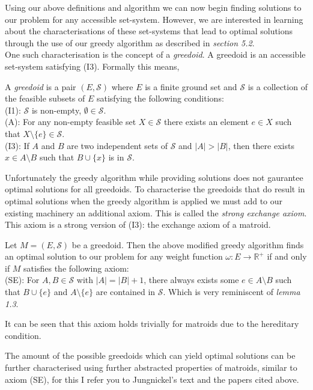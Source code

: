 \documentclass[../main.tex]{subfiles}
\begin{document}
\noindent Using our above definitions and algorithm we can now begin finding solutions to our problem for any accessible set-system. However, we are interested in learning about the characterisations of these set-systems that lead to optimal solutions through the use of our greedy algorithm as described in \textit{section 5.2}.\\
One such characterisation is the concept of a \textit{greedoid}. A greedoid is an accessible set-system satisfying (I3). Formally this means,
\begin{defn}
A \textit{greedoid} is a pair $(E,\mathcal{S})$ where $E$ is a finite ground set and $\mathcal{S}$ is a collection of the feasible subsets of $E$ satisfying the following conditions:\\
(I1): $\mathcal{S}$ is non-empty, $\emptyset \in \mathcal{S}.$\\
(A):  For any non-empty feasible set $X \in \mathcal{S}$ there exists an element $e \in X$ such that $X \setminus \{e\} \in \mathcal{S}.$\\
(I3): If $ A $ and $ B $ are two independent sets of $\mathcal{S}$ and $|A|>|B|$, then there exists $x \in A \setminus B$ such that $B \cup \{ x \}$ is in $\mathcal{S}.$
\end{defn}
Unfortunately the greedy algorithm while providing solutions does not gaurantee optimal solutions for all greedoids. To characterise the greedoids that do result in optimal solutions when the greedy algorithm is applied we must add to our existing machinery an additional axiom. This is called the \textit{strong exchange axiom}. This axiom is a strong version of (I3): the exchange axiom of a matroid. 
\begin{prop}
Let $M=(E,\mathcal{S})$ be a greedoid. Then the above modified greedy algorithm  finds an optimal solution to our problem for any weight function $\omega:E \longrightarrow \mathbb{R^+}$ if and only if $M$ satisfies the following axiom:\\
(SE): For $A,B \in \mathcal{S}$ with $|A|=|B|+1$, there always exists some $e \in A \setminus B$ such that $B \cup \{e\}$ and $A \setminus \{e\}$ are contained in $\mathcal{S}.$ Which is very reminiscent of \textit{lemma 1.3}.
\end{prop}
\begin{rem}
It can be seen that this axiom holds trivially for matroids due to the hereditary condition.
\end{rem}
\begin{rem}
The amount of the possible greedoids which can yield optimal solutions can be further characterised using further abstracted properties of matroids, similar to axiom (SE), for this I refer you to Jungnickel's text\cite{jungnickel} and the papers cited above.
\end{rem}
\end{document}
